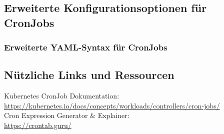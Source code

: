 \subsection{Erweiterte Konfigurationsoptionen für CronJobs}
\subsubsection{Erweiterte YAML-Syntax für CronJobs}


\subsection{Nützliche Links und Ressourcen}
Kubernetes CronJob Dokumentation:\\
\url{https://kubernetes.io/docs/concepts/workloads/controllers/cron-jobs/}\\
Cron Expression Generator \& Explainer:\\
\url{https://crontab.guru/}\\
